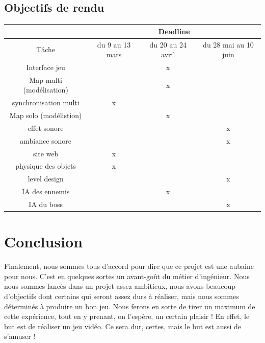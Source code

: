 \documentclass[12pt]{report}
\begin{document}
	\section{Objectifs de rendu}
	
	\begin{tabular}{|*{4}{c|}}
	\hline
	& \multicolumn{3}{|c|}{Deadline}\\
	\hline
	Tâche & du 9 au 13 mars & du 20 au 24 avril & du 28 mai au 10 juin \\
	\hline
	Interface jeu & & x & \\
	\hline
	Map multi (modélisation) & & x & \\
	\hline
	synchronisation multi & x & & \\
	\hline
	Map solo (modélistion) & & x & \\
	\hline
	effet sonore & & & x \\
	\hline
	ambiance sonore & & & x \\
	\hline
	site web & x & & \\
	\hline 
	physique des objets & x & & \\
	\hline 
	level design & & & x \\
	\hline 
	IA des ennemis & & x & \\
	\hline
	IA du boss & & & x \\
	\hline
	
	\end{tabular}
\chapter{Conclusion}
	Finalement, nous sommes tous d'accord pour dire que ce projet est une aubaine pour nous. C'est en quelques sortes un avant-goût du métier d'ingénieur. 
Nous nous sommes lancés dans un projet assez ambitieux, nous avons beaucoup d'objectifs dont certains qui seront assez durs à réaliser, mais nous sommes déterminés à produire un bon jeu. Nous ferons en sorte de tirer un maximum de cette expérience, tout en y prenant, on l'espère, un certain plaisir ! En effet, le but est de réaliser un jeu vidéo. Ce sera dur, certes, mais le but est aussi de s'amuser ! 
	
\end{document}
